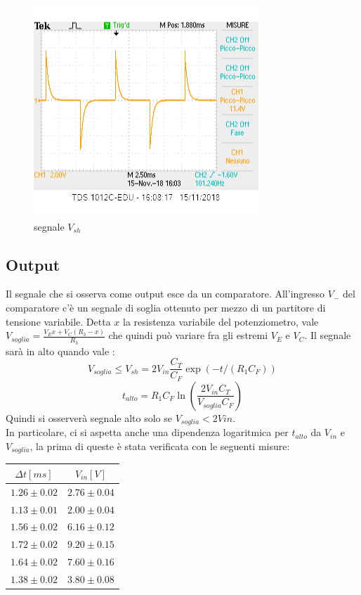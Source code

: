 \documentclass[10pt,a4paper]{article}
\begin{document}
		\begin{figure}
			\centering
			\includegraphics[scale=0.85]{sample.png}
			\caption{segnale $V_{sh}$}
			\label{fig:sample}
		\end{figure}
	\subsection{Output} \label{Output}
	
		Il segnale che si osserva come output esce da un comparatore.
		All'ingresso $V_-$ del comparatore c'è un segnale di soglia  ottenuto per mezzo di un partitore di tensione variabile. Detta $x$ la resistenza variabile del potenziometro, vale $V_{soglia}=\frac{V_E x+V_C(R_3-x)}{R_3}$ che quindi può variare fra gli estremi $V_E$  e $ V_C$.
		Il segnale sarà in alto quando vale :\[V_{soglia}\le V_{sh}=2V_{in} \frac{C_T}{C_F} \exp(-t/(R_1 C_F))\]
		\[t_{alto}=R_1 C_F \ln(\frac{2 V_{in} C_T}{V_{soglia} C_F})\] 
		Quindi si osserverà segnale alto solo se $V_{soglia} < 2 V{in}
$.
\\In particolare, ci si aspetta anche una dipendenza logaritmica per $t_{alto}$ da $V_{in}$ e $V_{soglia}$, la prima di queste è stata verificata con le seguenti misure:
\begin{center}
\begin{tabular}{|c|c|}
	
	\hline 
	$\Delta t [ms]$ & $V_{in}[V]$ \\ 
	\hline 
	$1.26\pm 0.02$ & $2.76\pm0.04$ \\ 
	\hline 
	$1.13\pm0.01$ & $2.00\pm0.04$ \\ 
	\hline 
	$1.56\pm0.02$ & $6.16\pm0.12$ \\ 
	\hline 
	$1.72\pm0.02$ & $9.20\pm0.15$ \\ 
	\hline 
	$1.64\pm0.02$ & $7.60\pm0.16$ \\ 
	\hline 
	$1.38\pm0.02$ & $3.80\pm0.08$ \\ 
	\hline 
\end{tabular} 
\end{center}
\end{document}
